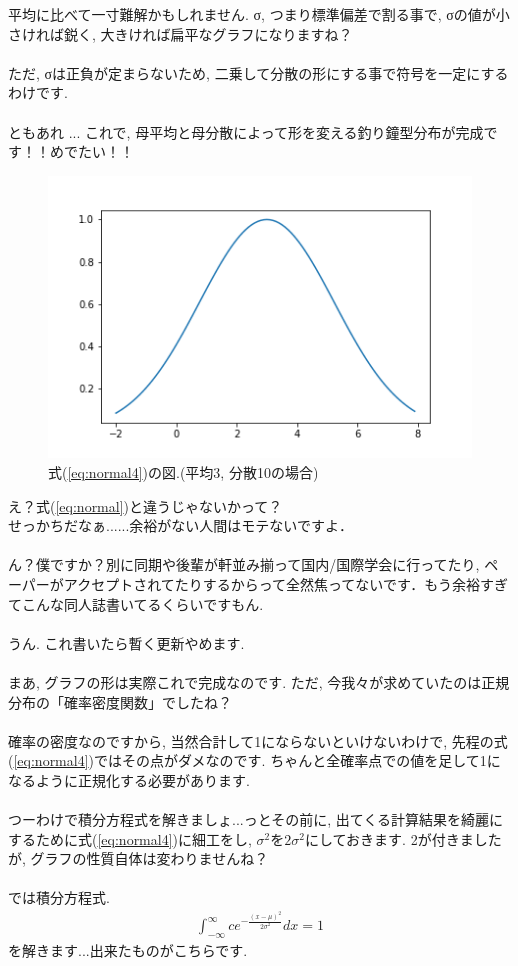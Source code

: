 \documentclass[11pt,a4paper]{jsarticle}                    %
\begin{document}
平均に比べて一寸難解かもしれません. σ, つまり標準偏差で割る事で, σの値が小さければ鋭く, 大きければ扁平なグラフになりますね？\\
\\
ただ, σは正負が定まらないため, 二乗して分散の形にする事で符号を一定にするわけです. \\
\\
ともあれ ... これで, 母平均と母分散によって形を変える釣り鐘型分布が完成です！！めでたい！！\\

\begin{figure}[H]
\label{im:normal}
  \centering
  \includegraphics[width=120mm,bb=0 0 432 288]{../figures/normal4.png}
  \caption{式(\ref{eq:normal4})の図.(平均3, 分散10の場合)}
\end{figure}

え？式(\ref{eq:normal})と違うじゃないかって？\\
せっかちだなぁ......余裕がない人間はモテないですよ．\\
\\
ん？僕ですか？別に同期や後輩が軒並み揃って国内/国際学会に行ってたり,  ペーパーがアクセプトされてたりするからって全然焦ってないです．もう余裕すぎてこんな同人誌書いてるくらいですもん. \\
\\
うん. これ書いたら暫く更新やめます.
\\
\\
まあ, グラフの形は実際これで完成なのです. ただ, 今我々が求めていたのは正規分布の「確率密度関数」でしたね？\\
\\
確率の密度なのですから, 当然合計して1にならないといけないわけで, 先程の式(\ref{eq:normal4})ではその点がダメなのです. ちゃんと全確率点での値を足して1になるように正規化する必要があります.\\
\\
つーわけで積分方程式を解きましょ...っとその前に, 出てくる計算結果を綺麗にするために式(\ref{eq:normal4})に細工をし, $\sigma^2$を$2\sigma^2$にしておきます. 2が付きましたが, グラフの性質自体は変わりませんね？\\
\\
では積分方程式.
\begin{eqnarray}
\int_{-\infty}^{\infty} c e^{-\frac{(x-\mu)^2}{2\sigma^2}} dx= 1
\end{eqnarray}
を解きます...出来たものがこちらです.
\end{document}
